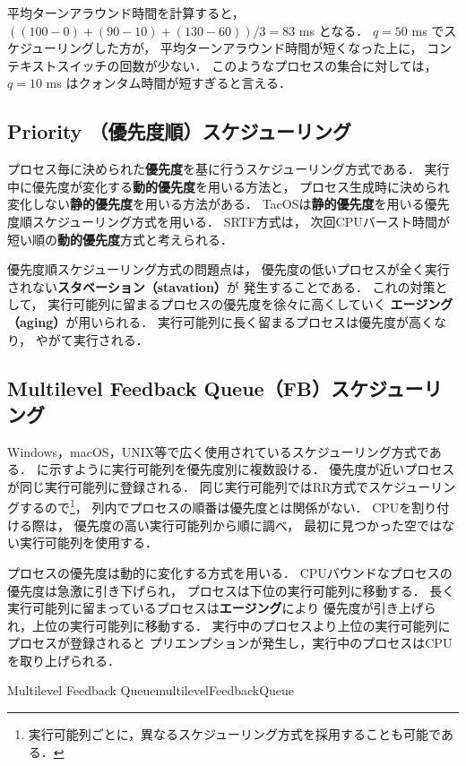 平均ターンアラウンド時間を計算すると，
$((100-0)+(90-10)+(130-60))/3=83$ ms となる．
$q = 50$ ms でスケジューリングした方が，
平均ターンアラウンド時間が短くなった上に，
コンテキストスイッチの回数が少ない．
このようなプロセスの集合に対しては，
$q = 10$ ms はクォンタム時間が短すぎると言える．

\subsection{Priority （優先度順）スケジューリング}
プロセス毎に決められた{\bf 優先度}を基に行うスケジューリング方式である．
実行中に優先度が変化する{\bf 動的優先度}を用いる方法と，
プロセス生成時に決められ変化しない{\bf 静的優先度}を用いる方法がある．
TacOSは{\bf 静的優先度}を用いる優先度順スケジューリング方式を用いる．
SRTF方式は，
次回CPUバースト時間が短い順の{\bf 動的優先度}方式と考えられる．

優先度順スケジューリング方式の問題点は，
優先度の低いプロセスが全く実行されない{\bf スタベーション（stavation）}が
発生することである．
これの対策として，
実行可能列に留まるプロセスの優先度を徐々に高くしていく
{\bf エージング（aging）}が用いられる．
実行可能列に長く留まるプロセスは優先度が高くなり，
やがて実行される．

\subsection{Multilevel Feedback Queue（FB）スケジューリング}
Windows，macOS，UNIX等で広く使用されているスケジューリング方式である．
に示すように実行可能列を優先度別に複数設ける．
優先度が近いプロセスが同じ実行可能列に登録される．
同じ実行可能列ではRR方式でスケジューリングするので\footnote{
実行可能列ごとに，異なるスケジューリング方式を採用することも可能である．
}，
列内でプロセスの順番は優先度とは関係がない．
CPUを割り付ける際は，
優先度の高い実行可能列から順に調べ，
最初に見つかった空ではない実行可能列を使用する．

プロセスの優先度は動的に変化する方式を用いる．
CPUバウンドなプロセスの優先度は急激に引き下げられ，
プロセスは下位の実行可能列に移動する．
長く実行可能列に留まっているプロセスは{\bf エージング}により
優先度が引き上げられ，上位の実行可能列に移動する．
実行中のプロセスより上位の実行可能列にプロセスが登録されると
プリエンプションが発生し，実行中のプロセスはCPUを取り上げられる．

{Multilevel Feedback Queue}{multilevelFeedbackQueue}

